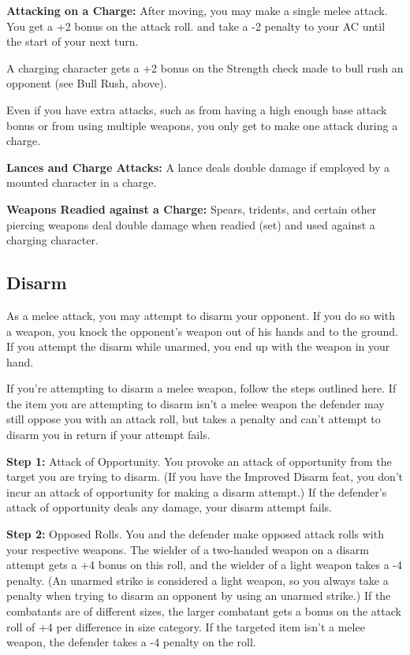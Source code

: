 \textbf{Attacking on a Charge:} After moving, you may make a single melee attack. 
You get a +2 bonus on the attack roll. and take a -2 penalty to your AC until the 
start of your next turn.

A charging character gets a +2 bonus on the Strength check made to bull rush an 
opponent (see Bull Rush, above).

Even if you have extra attacks, such as from having a high enough base attack bonus 
or from using multiple weapons, you only get to make one attack during a charge.

\textbf{Lances and Charge Attacks:} A lance deals double damage if employed by 
a mounted character in a charge.

\textbf{Weapons Readied against a Charge:} Spears, tridents, and certain other 
piercing weapons deal double damage when readied (set) and used against a charging 
character.

\subsection{Disarm}

As a melee attack, you may attempt to disarm your opponent. If you do so with a 
weapon, you knock the opponent's weapon out of his hands and to the ground. If 
you attempt the disarm while unarmed, you end up with the weapon in your hand.

If you're attempting to disarm a melee weapon, follow the steps outlined here. 
If the item you are attempting to disarm isn't a melee weapon the defender may 
still oppose you with an attack roll, but takes a penalty and can't attempt to 
disarm you in return if your attempt fails.

\textbf{Step 1:} Attack of Opportunity. You provoke an attack of opportunity from 
the target you are trying to disarm. (If you have the Improved Disarm feat, you 
don't incur an attack of opportunity for making a disarm attempt.) If the defender's 
attack of opportunity deals any damage, your disarm attempt fails.

\textbf{Step 2:} Opposed Rolls. You and the defender make opposed attack rolls 
with your respective weapons. The wielder of a two-handed weapon on a disarm attempt 
gets a +4 bonus on this roll, and the wielder of a light weapon takes a -4 penalty. 
(An unarmed strike is considered a light weapon, so you always take a penalty when 
trying to disarm an opponent by using an unarmed strike.) If the combatants are 
of different sizes, the larger combatant gets a bonus on the attack roll of +4 
per difference in size category. If the targeted item isn't a melee weapon, the 
defender takes a -4 penalty on the roll.

